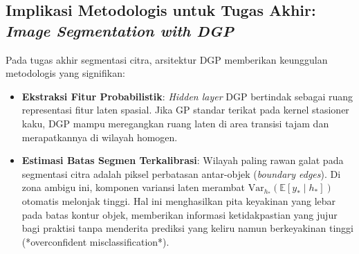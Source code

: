 \documentclass[11pt,a4paper]{article}
\begin{document}
\subsection{Implikasi Metodologis untuk Tugas Akhir: \textit{Image Segmentation with DGP}}
Pada tugas akhir segmentasi citra, arsitektur DGP memberikan keunggulan metodologis yang signifikan:
\begin{itemize}
    \item \textbf{Ekstraksi Fitur Probabilistik}: \textit{Hidden layer} DGP bertindak sebagai ruang representasi fitur laten spasial. Jika GP standar terikat pada kernel stasioner kaku, DGP mampu meregangkan ruang laten di area transisi tajam dan merapatkannya di wilayah homogen.
    \item \textbf{Estimasi Batas Segmen Terkalibrasi}: Wilayah paling rawan galat pada segmentasi citra adalah piksel perbatasan antar-objek (\textit{boundary edges}). Di zona ambigu ini, komponen variansi laten merambat $\mathrm{Var}_{h_*}(\mathbb{E}[y_* \mid h_*])$ otomatis melonjak tinggi. Hal ini menghasilkan pita keyakinan yang lebar pada batas kontur objek, memberikan informasi ketidakpastian yang jujur bagi praktisi tanpa menderita prediksi yang keliru namun berkeyakinan tinggi (*overconfident misclassification*).
\end{itemize}
\end{document}
